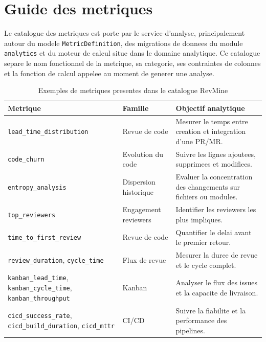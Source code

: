 \section{Guide des metriques}

Le catalogue des metriques est porte par le service d'analyse, principalement autour du modele
\texttt{MetricDefinition}, des migrations de donnees du module \texttt{analytics} et du moteur de
calcul situe dans le domaine analytique. Ce catalogue separe le nom fonctionnel de la metrique,
sa categorie, ses contraintes de colonnes et la fonction de calcul appelee au moment de generer
une analyse.

\begin{table}[H]
\centering
\small
\caption{Exemples de metriques presentes dans le catalogue RevMine}
\label{tab:annexe-metrics}
\begin{tabular}{|>{\raggedright\arraybackslash}p{3.8cm}
                |>{\raggedright\arraybackslash}p{4.2cm}
                |>{\raggedright\arraybackslash}p{6cm}|}
\hline
\textbf{Metrique} & \textbf{Famille} & \textbf{Objectif analytique} \\
\hline
\texttt{lead\_time\_distribution} & Revue de code & Mesurer le temps entre creation et integration d'une PR/MR. \\
\hline
\texttt{code\_churn} & Evolution du code & Suivre les lignes ajoutees, supprimees et modifiees. \\
\hline
\texttt{entropy\_analysis} & Dispersion historique & Evaluer la concentration des changements sur fichiers ou modules. \\
\hline
\texttt{top\_reviewers} & Engagement reviewers & Identifier les reviewers les plus impliques. \\
\hline
\texttt{time\_to\_first\_review} & Revue de code & Quantifier le delai avant le premier retour. \\
\hline
\texttt{review\_duration}, \texttt{cycle\_time} & Flux de revue & Mesurer la duree de revue et le cycle complet. \\
\hline
\texttt{kanban\_lead\_time}, \texttt{kanban\_cycle\_time}, \texttt{kanban\_throughput} & Kanban & Analyser le flux des issues et la capacite de livraison. \\
\hline
\texttt{cicd\_success\_rate}, \texttt{cicd\_build\_duration}, \texttt{cicd\_mttr} & CI/CD & Suivre la fiabilite et la performance des pipelines. \\
\hline
\end{tabular}
\end{table}

